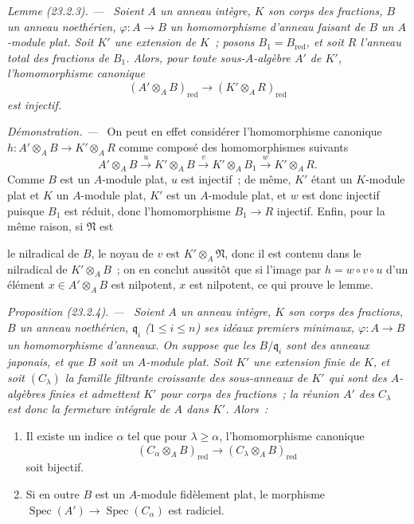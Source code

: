 \documentclass[10pt,oneside]{book}
\makeatletter
\newcommand{\setmanualcurrentlabel}[1]{\def\@currentlabel{#1}}
\newcommand{\oldpage}[2][]{%
  \setcounter{footnote}{0}%
  \marginpar{\scriptsize\textbf{#1}~|~#2}\ignorespaces}
\newenvironment{proposition}[1][]{%
  \setmanualcurrentlabel{#1}\par\medskip\noindent\itshape Proposition (#1). ---\ }{\par}
\newenvironment{lemma}[1][]{%
  \setmanualcurrentlabel{#1}\par\medskip\noindent\itshape Lemme (#1). ---\ }{\par}
\newenvironment{proof}{%
  \par\medskip\noindent\textit{Démonstration. ---\ }}{\par}
\makeatother
\begin{document}
\begin{lemma}[23.2.3]
\label{0.23.2.3-fr}
Soient $A$ un anneau intègre, $K$ son corps des fractions, $B$ un anneau
noethérien, $\varphi:A\to B$ un homomorphisme d'anneau faisant de $B$ un
$A$-module plat. Soit $K'$ une extension de $K$~; posons
$B_1=B_{\mathrm{red}}$, et soit $R$ l'anneau total des fractions de $B_1$.
Alors, pour toute sous-$A$-algèbre $A'$ de $K'$, l'homomorphisme canonique
\begin{equation}
\label{0.23.1.8.1-fr}
  (A'\otimes_AB)_{\mathrm{red}}
  \longrightarrow(K'\otimes_AR)_{\mathrm{red}}
  \tag{23.1.8.1}
\end{equation}
est injectif.
\end{lemma}

\begin{proof}
On peut en effet considérer l'homomorphisme canonique
$h:A'\otimes_AB\to K'\otimes_AR$ comme composé des homomorphismes suivants
\[
  A'\otimes_AB\xrightarrow{u}K'\otimes_AB
  \xrightarrow{v}K'\otimes_AB_1\xrightarrow{w}K'\otimes_AR.
\]
Comme $B$ est un $A$-module plat, $u$ est injectif~; de même, $K'$ étant un
$K$-module plat et $K$ un $A$-module plat, $K'$ est un $A$-module plat, et
$w$ est donc injectif puisque $B_1$ est réduit, donc l'homomorphisme
$B_1\to R$ injectif. Enfin, pour la même raison, si $\mathfrak N$ est

\oldpage[0\textsubscript{IV-1}]{218}

le nilradical de $B$, le noyau de $v$ est $K'\otimes_A\mathfrak N$, donc il est
contenu dans le nilradical de $K'\otimes_AB$~; on en conclut aussitôt que si
l'image par $h=w\circ v\circ u$ d'un élément $x\in A'\otimes_AB$ est
nilpotent, $x$ est nilpotent, ce qui prouve le lemme.
\end{proof}

\begin{proposition}[23.2.4]
\label{0.23.2.4-fr}
Soient $A$ un anneau intègre, $K$ son corps des fractions, $B$ un anneau
noethérien, $\mathfrak q_i$ ($1\leqslant i\leqslant n$) ses idéaux premiers
minimaux, $\varphi:A\to B$ un homomorphisme d'anneaux. On suppose que les
$B/\mathfrak q_i$ sont des anneaux japonais, et que $B$ soit un $A$-module
plat. Soit $K'$ une extension finie de $K$, et soit $(C_\lambda)$ la famille
filtrante croissante des sous-anneaux de $K'$ qui sont des $A$-algèbres
finies et admettent $K'$ pour corps des fractions~; la réunion $A'$ des
$C_\lambda$ est donc la fermeture intégrale de $A$ dans $K'$. Alors~:
\begin{enumerate}
  \item[(i)] Il existe un indice $\alpha$ tel que pour $\lambda\geqslant
  \alpha$, l'homomorphisme canonique
  \begin{equation}
  \label{0.23.2.4.1-fr}
    (C_\alpha\otimes_AB)_{\mathrm{red}}
    \longrightarrow(C_\lambda\otimes_AB)_{\mathrm{red}}
    \tag{23.2.4.1}
  \end{equation}
  soit bijectif.
  \item[(ii)] Si en outre $B$ est un $A$-module fidèlement plat, le morphisme
  $\operatorname{Spec}(A')\to\operatorname{Spec}(C_\alpha)$ est radiciel.
\end{enumerate}
\end{proposition}
\end{document}
